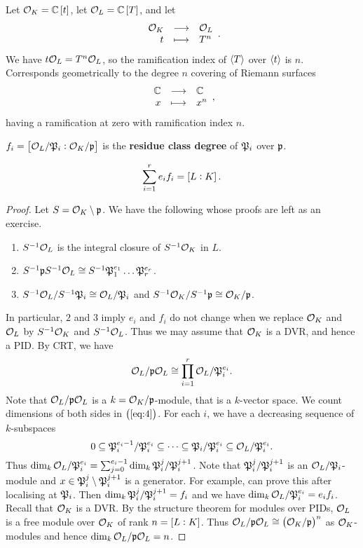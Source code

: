 \begin{example*}
Let $ \OOO_K = \CC\sbr{t} $, let $ \OOO_L = \CC\sbr{T} $, and let
$$ \function{\OOO_K}{\OOO_L}{t}{T^n}. $$
We have $ t\mathcal{O}_L = T^n\mathcal{O}_L $, so the ramification index of $ \left\langle T \right\rangle $ over $ \left\langle t \right\rangle $ is $ n $. Corresponds geometrically to the degree $ n $ covering of Riemann surfaces
$$ \function{\CC}{\CC}{x}{x^n}, $$
having a ramification at zero with ramification index $ n $.
\end{example*}

\begin{definition}
$ f_i = \sbr{\OOO_L / \pp_i : \OOO_K / \ppp} $ is the \textbf{residue class degree} of $ \mathfrak{P}_i $ over $ \mathfrak{p} $.
\end{definition}

\begin{theorem}
\label{thm:13.3}
$$ \sum_{i = 1}^r e_if_i = \sbr{L : K}. $$
\end{theorem}

\begin{proof}
Let $ S = \mathcal{O}_K \setminus \mathfrak{p} $. We have the following whose proofs are left as an exercise.
\begin{enumerate}
\item $ S^{-1}\mathcal{O}_L $ is the integral closure of $ S^{-1}\mathcal{O}_K $ in $ L $.
\item $ S^{-1}\mathfrak{p} S^{-1}\mathcal{O}_L \cong S^{-1}\mathfrak{P}_1^{e_1} \dots \mathfrak{P}_r^{e_r} $.
\item $ S^{-1}\mathcal{O}_L / S^{-1}\mathfrak{P}_i \cong \mathcal{O}_L / \mathfrak{P}_i $ and $ S^{-1}\mathcal{O}_K / S^{-1}\mathfrak{p} \cong \mathcal{O}_K / \mathfrak{p} $.
\end{enumerate}
In particular, $ 2 $ and $ 3 $ imply $ e_i $ and $ f_i $ do not change when we replace $ \mathcal{O}_K $ and $ \mathcal{O}_L $ by $ S^{-1}\mathcal{O}_K $ and $ S^{-1}\mathcal{O}_L $. Thus we may assume that $ \mathcal{O}_K $ is a DVR, and hence a PID. By CRT, we have
\begin{equation}
\label{eq:4}
\mathcal{O}_L / \mathfrak{p}\mathcal{O}_L \cong \prod_{i = 1}^r \mathcal{O}_L / \mathfrak{P}_i^{e_i}.
\end{equation}
Note that $ \mathcal{O}_L / \mathfrak{p}\mathcal{O}_L $ is a $ k = \mathcal{O}_K / \mathfrak{p} $-module, that is a $ k $-vector space. We count dimensions of both sides in $ \br{\ref{eq:4}} $. For each $ i $, we have a decreasing sequence of $ k $-subspaces
$$ 0 \subseteq \mathfrak{P}_i^{e_i - 1} / \mathfrak{P}_i^{e_i} \subseteq \dots \subseteq \mathfrak{P}_i / \mathfrak{P}_i^{e_i} \subseteq \mathcal{O}_L / \mathfrak{P}_i^{e_i}. $$
Thus $ \dim_k \mathcal{O}_L / \mathfrak{P}_i^{e_i} = \sum_{j = 0}^{e_i - 1} \dim_k \mathfrak{P}_i^j / \mathfrak{P}_i^{j + 1} $. Note that $ \mathfrak{P}_i^j / \mathfrak{P}_i^{j + 1} $ is an $ \mathcal{O}_L / \mathfrak{P}_i $-module and $ x \in \mathfrak{P}_i^j \setminus \mathfrak{P}_i^{j + 1} $ is a generator. For example, can prove this after localising at $ \mathfrak{P}_i $. Then $ \dim_k \mathfrak{P}_i^j / \mathfrak{P}_i^{j + 1} = f_i $ and we have $ \dim_k \mathcal{O}_L / \mathfrak{P}_i^{e_i} = e_if_i $. Recall that $ \mathcal{O}_K $ is a DVR. By the structure theorem for modules over PIDs, $ \mathcal{O}_L $ is a free module over $ \mathcal{O}_K $ of rank $ n = \sbr{L : K} $. Thus $ \OOO_L / \ppp\OOO_L \cong \br{\OOO_K / \ppp}^n $ as $ \mathcal{O}_K $-modules and hence $ \dim_k \mathcal{O}_L / \mathfrak{p}\mathcal{O}_L = n $.
\end{proof}

